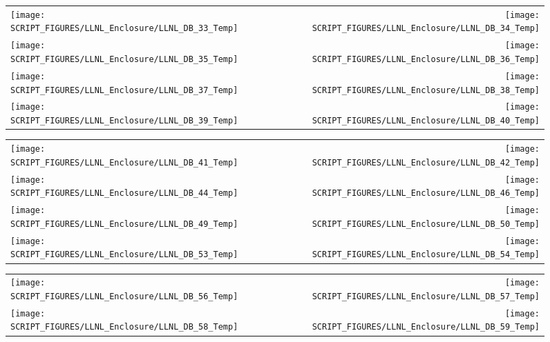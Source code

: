 \begin{figure}[!ht]
\begin{tabular*}{\textwidth}{l@{\extracolsep{\fill}}r}
\texttt{[image: SCRIPT\_FIGURES/LLNL\_Enclosure/LLNL\_DB\_33\_Temp]} &
\texttt{[image: SCRIPT\_FIGURES/LLNL\_Enclosure/LLNL\_DB\_34\_Temp]} \\
\texttt{[image: SCRIPT\_FIGURES/LLNL\_Enclosure/LLNL\_DB\_35\_Temp]} &
\texttt{[image: SCRIPT\_FIGURES/LLNL\_Enclosure/LLNL\_DB\_36\_Temp]} \\
\texttt{[image: SCRIPT\_FIGURES/LLNL\_Enclosure/LLNL\_DB\_37\_Temp]} &
\texttt{[image: SCRIPT\_FIGURES/LLNL\_Enclosure/LLNL\_DB\_38\_Temp]} \\
\texttt{[image: SCRIPT\_FIGURES/LLNL\_Enclosure/LLNL\_DB\_39\_Temp]} &
\texttt{[image: SCRIPT\_FIGURES/LLNL\_Enclosure/LLNL\_DB\_40\_Temp]}
\end{tabular*}
\end{figure}

\begin{figure}[!ht]
\begin{tabular*}{\textwidth}{l@{\extracolsep{\fill}}r}
\texttt{[image: SCRIPT\_FIGURES/LLNL\_Enclosure/LLNL\_DB\_41\_Temp]} &
\texttt{[image: SCRIPT\_FIGURES/LLNL\_Enclosure/LLNL\_DB\_42\_Temp]} \\
\texttt{[image: SCRIPT\_FIGURES/LLNL\_Enclosure/LLNL\_DB\_44\_Temp]} &
\texttt{[image: SCRIPT\_FIGURES/LLNL\_Enclosure/LLNL\_DB\_46\_Temp]} \\
\texttt{[image: SCRIPT\_FIGURES/LLNL\_Enclosure/LLNL\_DB\_49\_Temp]} &
\texttt{[image: SCRIPT\_FIGURES/LLNL\_Enclosure/LLNL\_DB\_50\_Temp]} \\
\texttt{[image: SCRIPT\_FIGURES/LLNL\_Enclosure/LLNL\_DB\_53\_Temp]} &
\texttt{[image: SCRIPT\_FIGURES/LLNL\_Enclosure/LLNL\_DB\_54\_Temp]}
\end{tabular*}
\end{figure}

\begin{figure}[!ht]
\begin{tabular*}{\textwidth}{l@{\extracolsep{\fill}}r}
\texttt{[image: SCRIPT\_FIGURES/LLNL\_Enclosure/LLNL\_DB\_56\_Temp]} &
\texttt{[image: SCRIPT\_FIGURES/LLNL\_Enclosure/LLNL\_DB\_57\_Temp]} \\
\texttt{[image: SCRIPT\_FIGURES/LLNL\_Enclosure/LLNL\_DB\_58\_Temp]} &
\texttt{[image: SCRIPT\_FIGURES/LLNL\_Enclosure/LLNL\_DB\_59\_Temp]}
\end{tabular*}
\end{figure}

